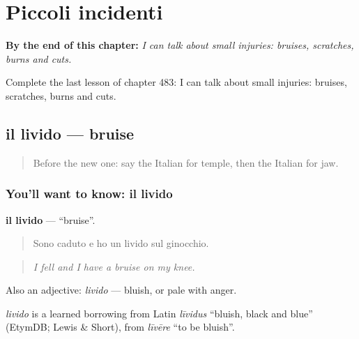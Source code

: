 
\chapter{Piccoli incidenti}
\label{ch:it-piccoli-incidenti}

\begin{chapteropening}
\textbf{By the end of this chapter:} \emph{I can talk about small injuries: bruises, scratches, burns and cuts.}

Complete the last lesson of chapter 483: I can talk about small injuries: bruises, scratches, burns and cuts.
\end{chapteropening}

\section[il livido]{il livido — bruise}

\label{lesson:IT-C483-livido}



\begin{quote}
Before the new one: say the Italian for temple, then the Italian for jaw.
\end{quote}

\subsection*{You'll want to know: il livido}
\textbf{il livido} — \textquotedblleft{}bruise\textquotedblright{}.

\begin{quote}
Sono caduto e ho un livido sul ginocchio.
\end{quote}

\begin{quote}
\emph{I fell and I have a bruise on my knee.}
\end{quote}

Also an adjective: \emph{livido} — bluish, or pale with anger.

\begin{cousinweb}
\emph{livido} is a learned borrowing from Latin \emph{līvidus} \textquotedblleft{}bluish, black and blue\textquotedblright{} (EtymDB; Lewis \& Short), from \emph{līvēre} \textquotedblleft{}to be bluish\textquotedblright{}.
\end{cousinweb}

